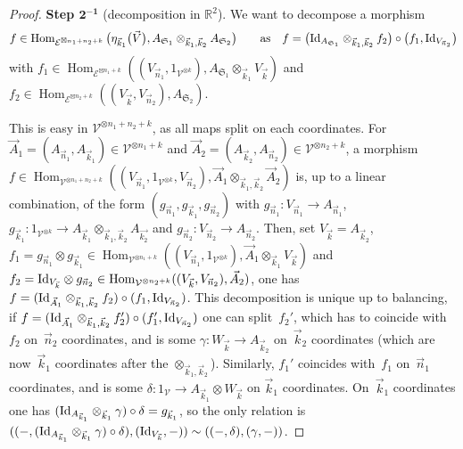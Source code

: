 \documentclass[pdftex]{sigma}%
\numberwithin{equation}{section}
\newcommand{\Hom}{\operatorname{Hom}}
\begin{document}
\begin{proof}
\medskip \noindent
\textbf{Step $\boldsymbol{2^{-1}}$} \big(decomposition in $\mathbb{R}^2$\big). We want to decompose a morphism \[
f\in\Hom_{\mathcal{E}^{\boxtimes n_1+n_2+k}}\big(\eta_{\vec{k}_1}\big(\vec{V}\big),A_{\mathfrak{S}_1}\otimes_{\vec{k}_1,\vec{k}_2}A_{\mathfrak{S}_2}\big)\qquad \text{as}\quad
f = \big({\rm Id}_{A_{\mathfrak{S}_1}} \otimes_{\vec{k}_1,\vec{k}_2} f_2\big) \circ \big(f_1 , {\rm Id}_{V_{\vec{n}_2}}\big)
\]
with $f_1\in\Hom_{\mathcal{E}^{\boxtimes n_1+k}}((V_{\vec{n}_1},1_{\mathcal{V}^{\otimes k}}), A_{\mathfrak{S}_1}\otimes_{\vec{k}_1} V_{\vec{k}})$ and $f_2\in\Hom_{\mathcal{E}^{\boxtimes n_2+k}}((V_{\vec{k}},V_{\vec{n}_2}), A_{\mathfrak{S}_2})$.

This is easy in $\mathcal{V}^{\otimes n_1+n_2+k}$, as all maps split on each coordinates. For $\vec{A}_1=(A_{\vec{n}_1},A_{\vec{k}_1}) \in \mathcal{V}^{\otimes n_1+k}$ and $\vec{A}_2=(A_{\vec{k}_2},A_{\vec{n}_2}) \in \mathcal{V}^{\otimes n_2+k}$, a morphism $f \in \Hom_{\mathcal{V}^{\otimes n_1+n_2+k}}((V_{\vec{n}_1},1_{\mathcal{V}^{\otimes k}},V_{\vec{n}_2}),\allowbreak \vec{A}_1 \otimes_{\vec{k}_1,\vec{k}_2} \vec{A}_2)$ is, up to a linear combination, of the form $(g_{\vec{n}_1},g_{\vec{k}_1},g_{\vec{n}_2})$ with $g_{\vec{n}_1}\colon V_{\vec{n}_1} \to A_{\vec{n}_1}$, $g_{\vec{k}_1}\colon 1_{\mathcal{V}^{\otimes k}} \to A_{\vec{k}_1}\otimes_{\vec{k}_1,\vec{k}_2} A_{\vec{k_2}}$ and $g_{\vec{n}_2}\colon V_{\vec{n}_2}\to A_{\vec{n}_2}$.
Then, set $V_{\vec{k}} = A_{\vec{k}_2}$, $f_1 = g_{\vec{n}_1} \otimes g_{\vec{k}_1} \in \Hom_{\mathcal{V}^{\otimes n_1+k}}((V_{\vec{n}_1},1_{\mathcal{V}^{\otimes k}}), \allowbreak \vec{A}_1\otimes_{\vec{k}_1} V_{\vec{k}})$ and $f_2 = {\rm Id}_{V_{\vec{k}}} \otimes g_{\vec{n}_2} \in \Hom_{\mathcal{V}^{\otimes n_2+k}}((V_{\vec{k}},V_{\vec{n}_2}),\vec{A}_2)$, one has $f= ({\rm Id}_{\vec{A}_1} \otimes_{\vec{k}_1,\vec{k}_2} f_2) \circ (f_1 , {\rm Id}_{V_{\vec{n}_2}})$. This decomposition is unique up to balancing, if $f= ({\rm Id}_{\vec{A}_1} \otimes_{\vec{k}_1,\vec{k}_2} f_2') \circ (f_1' , {\rm Id}_{V_{\vec{n}_2}})$ one can split~$f_2'$, which has to coincide with~$f_2$ on~$\vec{n}_2$ coordinates, and is some $\gamma\colon W_{\vec{k}} \to A_{\vec{k}_2}$ on~$\vec{k}_2$ coordinates (which are now~$\vec{k}_1$ coordinates after the $\otimes_{\vec{k}_1,\vec{k}_2}$). Similarly, $f_1'$ coincides with~$f_1$ on~$\vec{n}_1$ coordinates, and is some $\delta\colon 1_\mathcal{V} \to A_{\vec{k}_1}\otimes W_{\vec{k}}$ on $\vec{k}_1$ coordinates. On~$\vec{k}_1$ coordinates one has $({\rm Id}_{A_{\vec{k}_1}}\otimes_{\vec{k}_1}\gamma) \circ \delta = g_{\vec{k}_1}$, so the only relation is $((-,({\rm Id}_{A_{\vec{k}_1}}\otimes_{\vec{k}_1}\gamma) \circ \delta),({\rm Id}_{V_{\vec{k}}},-))\sim ((-,\delta),(\gamma,-))$.


\end{proof}
\end{document}
